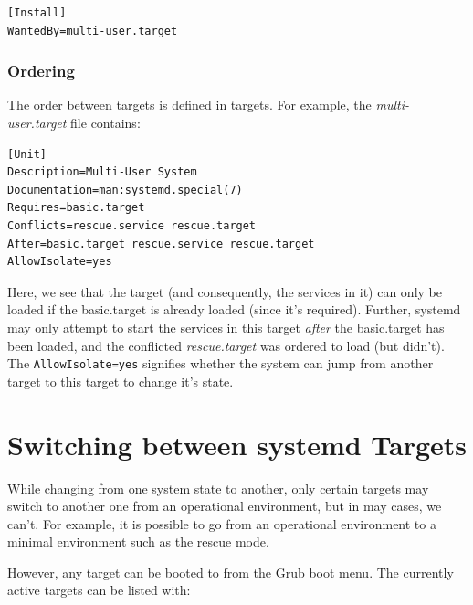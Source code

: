 \vspace{-15pt}
\begin{verbatim}
[Install]
WantedBy=multi-user.target
\end{verbatim}
\vspace{-10pt}

\subsubsection{Ordering}
\vspace{-10pt}
The order between targets is defined in targets. For example, the \textit{multi-user.target} file contains:

\vspace{-15pt}
\begin{verbatim}
[Unit]
Description=Multi-User System
Documentation=man:systemd.special(7)
Requires=basic.target
Conflicts=rescue.service rescue.target
After=basic.target rescue.service rescue.target
AllowIsolate=yes
\end{verbatim}
\vspace{-10pt}

\noindent
Here, we see that the target (and consequently, the services in it) can only be loaded if the basic.target is already loaded (since it's required). Further, systemd may only attempt to start the services in this target \textit{after} the basic.target has been loaded, and the conflicted \textit{rescue.target} was ordered to load (but didn't). The \verb|AllowIsolate=yes| signifies whether the system can jump from another target to this target to change it's state. 

\section{Switching between systemd Targets}
While changing from one system state to another, only certain targets may switch to another one from an operational environment, but in may cases, we can't. For example, it is possible to go from an operational environment to a minimal environment such as the rescue mode. 

However, any target can be booted to from the Grub boot menu. The currently active targets can be listed with:

